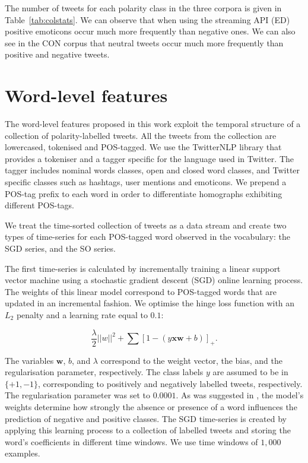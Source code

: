 \documentclass{sig-alternate}
\begin{document}
The number of tweets for each polarity class in the three corpora is given in Table~\ref{tab:colstats}. We can observe that when using the streaming API (ED) positive emoticons occur much more frequently than negative ones. We can also see in the CON corpus that neutral tweets occur much more frequently than positive and negative tweets.



\section{Word-level features}\label{sec:feat}

The word-level features proposed in this work exploit the temporal structure of a collection of polarity-labelled tweets. All the tweets from the collection are lowercased, tokenised and POS-tagged. We use the TwitterNLP library \cite{twitterNLP} that provides a  tokeniser and a tagger specific for the language used in Twitter. The tagger includes  nominal words classes, open and closed word classes, and Twitter specific classes such as hashtags, user mentions and emoticons. We prepend a POS-tag prefix to each word in order to differentiate homographs exhibiting different POS-tags.

We  treat the time-sorted collection of tweets as a data stream and create two types of time-series for each POS-tagged word observed in the vocabulary: the SGD series, and the SO series.

The first time-series is calculated by incrementally training a linear support vector machine using a stochastic gradient descent (SGD) online learning process. The weights of this linear model correspond to POS-tagged words that are updated in an incremental fashion. We  optimise the hinge loss function with an $L_2$ penalty and a learning rate equal to $0.1$:
 
\begin{equation}
\frac{\lambda}{2}||w||^2+\sum [1- (y \mathbf{xw} +b) ]_{+}.
\end{equation}

The variables $\mathbf{w}$, $b$, and $\lambda$ correspond to the weight vector, the bias, and the regularisation parameter, respectively. The class labels $y$ are assumed to be in $\{+1,-1\}$, corresponding to positively and negatively labelled tweets, respectively. The regularisation parameter was set to $0.0001$.  As was suggested in \cite{bifet2010}, the model's weights determine how strongly the absence or presence of a word influences the prediction of negative and positive classes.  The SGD time-series is created by applying this learning process to a collection of labelled tweets and storing the word's coefficients in different time windows. We use time windows of $1,000$ examples.  
\end{document}
